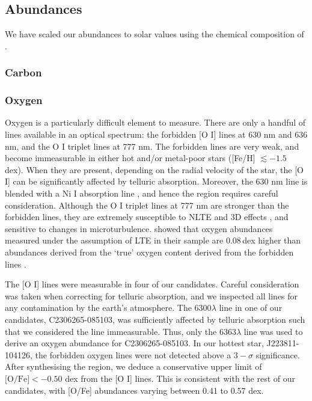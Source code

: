 \documentclass{emulateapj}
\begin{document}
\subsection{Abundances}
We have scaled our abundances to solar values using the chemical composition of \citet{asplund;et-al_2009}.

\subsubsection{Carbon}

\subsubsection{Oxygen}
\label{sec:oxygen-abundances}
Oxygen is a particularly difficult element to measure. There are only a handful of lines available in an optical spectrum: the forbidden [O \textsc{I}] lines at 630 nm and 636 nm, and the O \textsc{I} triplet lines at 777 nm. The forbidden lines are very weak, and become immeasurable in either hot and/or metal-poor stars ([Fe/H] $\lesssim -1.5$ dex). When they are present, depending on the radial velocity of the star, the [O \textsc{I}] can be significantly affected by telluric absorption. Moreover, the 630 nm line is blended with a Ni \textsc{I} absorption line \citep{allende-prieto;et-al_2001}, and hence the region requires careful consideration. Although the O \textsc{I} triplet lines at 777 nm are stronger than the forbidden lines, they are extremely susceptible to NLTE and 3D effects \citep{asplund;perez_2001}, and sensitive to changes in microturbulence. \citet{perez;et-al_2006} showed that oxygen abundances measured under the assumption of LTE in their sample are 0.08\,dex higher than abundances derived from the `true' oxygen content derived from the forbidden lines \citep{perez;et-al_2006}. 

The [O \textsc{I}] lines were measurable in four of our candidates. Careful consideration was taken when correcting for telluric absorption, and we inspected all lines for any contamination by the earth's atmosphere. The 6300$\lambda$ line in one of our candidates, C2306265-085103, was sufficiently affected by telluric absorption such that we considered the line immeasurable. Thus, only the 6363$\lambda$ line was used to derive an oxygen abundance for C2306265-085103. In our hottest star, J223811-104126, the forbidden oxygen lines were not detected above a $3-\sigma$ significance. After synthesising the region, we deduce a conservative upper limit of $\mbox{[O/Fe]} < -0.50$ dex from the [O \textsc{I}] lines. This is consistent with the rest of our candidates, with [O/Fe] abundances varying between 0.41 to 0.57 dex.
\end{document}
